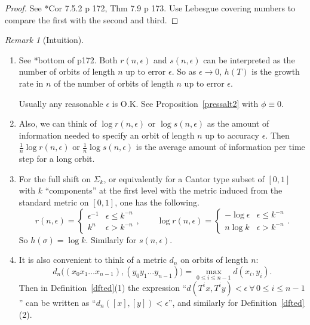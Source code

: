 \documentclass[a4paper]{amsart}
\theoremstyle{plain}
\theoremstyle{definition}
\theoremstyle{remark}
\newtheorem{remark}[theorem]{Remark}
\begin{document}
\begin{proof}
See \cite{Wal}*{Cor 7.5.2 p 172, Thm 7.9 p 173}.  Use Lebesgue covering numbers to compare the first with the second and third.
\end{proof}


\begin{remark}[Intuition]  \mbox{}
\begin{enumerate}

\item See \cite{Wal}*{bottom of p172}. Both $ r(n,\epsilon ) $ and $ s(n,\epsilon ) $ can be interpreted as the number of orbits of length $ n $ up to error $  \epsilon$.  So as $ \epsilon \to 0 $, $ h(T) $ is the growth rate in $ n $ of the number of orbits of length $ n $ up to   error $ \epsilon $.   

Usually any reasonable $ \epsilon $ is O.K.  See  Proposition~\ref{pressalt2} with $ \phi \equiv 0 $. 


\item Also, we can think of $  \log r(n,\epsilon) $ or $  \log s(n,\epsilon) $ as the amount of information needed to specify an orbit of length $ n $ up to accuracy $ \epsilon$.  Then  $ \frac{1}{n} \log r(n,\epsilon) $ or 
$  \frac{1}{n} \log s(n,\epsilon) $ is the average amount of information per time step for a long orbit.

\item For the full shift on $ \Sigma_k $, or equivalently for a Cantor type subset of $ [0,1] $ with $ k $ ``components'' at the first level with the metric induced from the standard metric on $ [0,1] $, one has the following. 
\[
r(n,\epsilon)  = \begin{cases} \epsilon ^{-1} & \epsilon \leq k^{-n} \\
                                                   k^n              &    \epsilon > k^{-n}
                          \end{cases} ,              \qquad 
\log r(n,\epsilon)  = \begin{cases} -\log  \epsilon & \epsilon \leq k^{-n} \\
                                                   n \log k               &    \epsilon > k^{-n}
                          \end{cases}   .
\]
So $ h(\sigma) = \log k $.  Similarly for $ s (n, \epsilon ) $.

\item It is also convenient to think of a metric $ d_n $ on orbits of length $ n $:
\[
d_n\big((x_0x_1\dots x_{n-1}), (y_0y_1\dots y_{n-1})\big) = \max_{0\leq i \leq n-1} d(x_i,y_i).
\]
Then in Definition~\ref{dfted}(1)  the expression ``$ d(T^ix,T^iy) < \epsilon \ \forall\, 0 \leq i \leq n-1  $'' can be written  as ``$ d_n([x],[y]) < \epsilon $'', and similarly for Definition~\ref{dfted}(2).



\end{enumerate} 
  \end{remark} 
\end{document}
